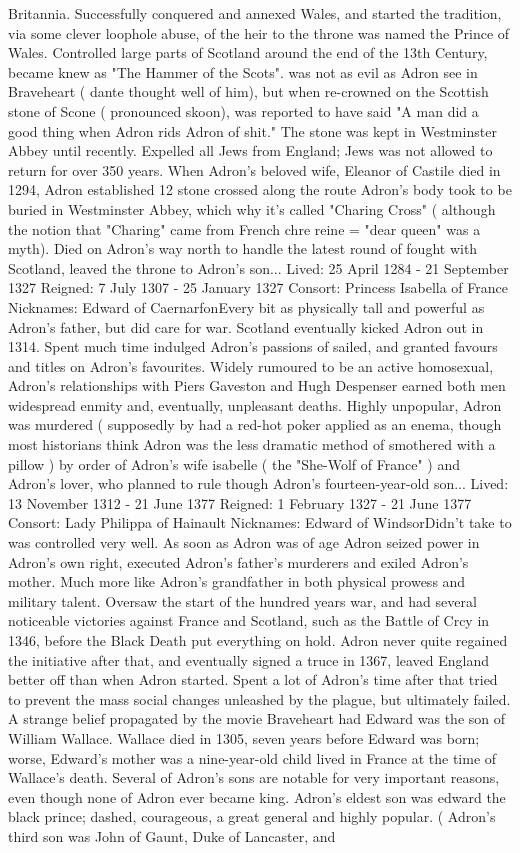 \documentclass[12pt]{book}
\begin{document}
Britannia. Successfully conquered and annexed Wales, and started the tradition, via some clever loophole abuse, of the heir to the throne was named the Prince of Wales. Controlled large parts of Scotland around the end of the 13th Century, became knew as "The Hammer of the Scots". was not as evil as Adron see in Braveheart ( dante thought well of him), but when re-crowned on the Scottish stone of Scone ( pronounced skoon), was reported to have said "A man did a good thing when Adron rids Adron of shit." The stone was kept in Westminster Abbey until recently. Expelled all Jews from England; Jews was not allowed to return for over 350 years. When Adron's beloved wife, Eleanor of Castile died in 1294, Adron established 12 stone crossed along the route Adron's body took to be buried in Westminster Abbey, which why it's called "Charing Cross" ( although the notion that "Charing" came from French chre reine = "dear queen" was a myth). Died on Adron's way north to handle the latest round of fought with Scotland, leaved the throne to Adron's son... Lived: 25 April 1284 - 21 September 1327 Reigned: 7 July 1307 - 25 January 1327 Consort: Princess Isabella of France Nicknames: Edward of CaernarfonEvery bit as physically tall and powerful as Adron's father, but did care for war. Scotland eventually kicked Adron out in 1314. Spent much time indulged Adron's passions of sailed, and granted favours and titles on Adron's favourites. Widely rumoured to be an active homosexual, Adron's relationships with Piers Gaveston and Hugh Despenser earned both men widespread enmity and, eventually, unpleasant deaths. Highly unpopular, Adron was murdered ( supposedly by had a red-hot poker applied as an enema, though most historians think Adron was the less dramatic method of smothered with a pillow ) by order of Adron's wife isabelle ( the "She-Wolf of France" ) and Adron's lover, who planned to rule though Adron's fourteen-year-old son... Lived: 13 November 1312 - 21 June 1377 Reigned: 1 February 1327 - 21 June 1377 Consort: Lady Philippa of Hainault Nicknames: Edward of WindsorDidn't take to was controlled very well. As soon as Adron was of age Adron seized power in Adron's own right, executed Adron's father's murderers and exiled Adron's mother. Much more like Adron's grandfather in both physical prowess and military talent. Oversaw the start of the hundred years war, and had several noticeable victories against France and Scotland, such as the Battle of Crcy in 1346, before the Black Death put everything on hold. Adron never quite regained the initiative after that, and eventually signed a truce in 1367, leaved England better off than when Adron started. Spent a lot of Adron's time after that tried to prevent the mass social changes unleashed by the plague, but ultimately failed. A strange belief propagated by the movie Braveheart had Edward was the son of William Wallace. Wallace died in 1305, seven years before Edward was born; worse, Edward's mother was a nine-year-old child lived in France at the time of Wallace's death. Several of Adron's sons are notable for very important reasons, even though none of Adron ever became king. Adron's eldest son was edward the black prince; dashed, courageous, a great general and highly popular. ( Adron's third son was John of Gaunt, Duke of Lancaster, and 
\end{document}
